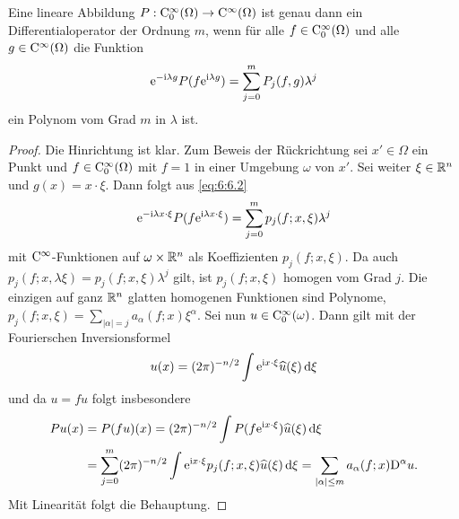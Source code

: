 \begin{lem}
Eine  lineare Abbildung   $P:\mathrm C_0^\infty(\Omega)\to\mathrm C^\infty(\Omega)$ ist genau dann ein Differentialoperator der Ordnung $m$, wenn für alle $f\in\mathrm C_0^\infty(\Omega)$ und alle $g\in\mathrm C^\infty(\Omega)$ die Funktion 
\begin{equation}\label{eq:6:6.2}
\mathrm e^{-\mathrm i\lambda g} P(f\mathrm e^{\mathrm i\lambda g}) = \sum_{j=0}^m P_j(f,g) \lambda^j
\end{equation}
ein Polynom vom Grad $m$ in $\lambda$ ist.
\end{lem}
\begin{proof}
Die Hinrichtung ist klar. Zum Beweis der Rückrichtung sei $x'\in\Omega$ ein Punkt und $f\in\mathrm C_0^\infty(\Omega)$ mit $f=1$  in einer Umgebung $\omega$ von $x'$. Sei weiter $\xi\in\mathbb R^n$ und $g(x) = x\cdot\xi$. Dann folgt aus \eqref{eq:6:6.2}
\begin{equation}
    \mathrm e^{-\mathrm i \lambda x\cdot\xi} P ( f\mathrm e^{\mathrm i \lambda x\cdot\xi}) = \sum_{j=0}^m p_j(f;x,\xi) \lambda^j
\end{equation}
mit $\mathrm C^\infty$-Funktionen auf $\omega\times\mathbb R^n$ als Koeffizienten $p_j(f;x,\xi)$. Da auch
$p_j(f;x,\lambda\xi)=p_j(f;x,\xi)\lambda^j$ gilt, ist $p_j(f;x,\xi)$ homogen vom Grad $j$. Die einzigen auf ganz $\mathbb R^n$ glatten homogenen Funktionen sind Polynome,
$p_j(f;x,\xi) = \sum_{|\alpha|=j} a_\alpha(f;x) \xi^\alpha$. Sei nun $u\in\mathrm C_0^\infty(\omega)$. Dann gilt mit der Fourierschen Inversionsformel
\begin{equation}
    u(x) = (2\pi)^{-n/2} \int \mathrm e^{\mathrm i x\cdot\xi} \widehat u(\xi)\,\mathrm d\xi
\end{equation}
und da $u=fu$ folgt insbesondere 
\begin{align}
    Pu(x) &= P(fu)(x) = (2\pi)^{-n/2} \int P(f \mathrm e^{\mathrm i x\cdot\xi}) \widehat u(\xi)\,\mathrm d\xi \notag \\&= \sum_{j=0}^m (2\pi)^{-n/2} \int \mathrm e^{\mathrm i x\cdot\xi} p_j(f;x,\xi) \widehat u(\xi)\,\mathrm d\xi
    = \sum_{|\alpha|\le m} a_\alpha(f;x)\mathrm D^\alpha u.
\end{align}
Mit Linearität folgt die Behauptung.
\end{proof}
